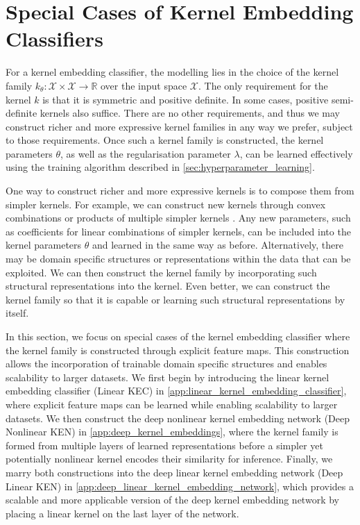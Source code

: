 \documentclass{article}
\begin{document}
		
			
\newpage
\section{Special Cases of Kernel Embedding Classifiers}
\label{app:special_cases}

	For a kernel embedding classifier, the modelling lies in the choice of the kernel family $k_{\theta} : \mathcal{X} \times \mathcal{X} \to \mathbb{R}$ over the input space $\mathcal{X}$. The only requirement for the kernel $k$ is that it is symmetric and positive definite. In some cases, positive semi-definite kernels also suffice. There are no other requirements, and thus we may construct richer and more expressive kernel families in any way we prefer, subject to those requirements. Once such a kernel family is constructed, the kernel parameters $\theta$, as well as the regularisation parameter $\lambda$, can be learned effectively using the training algorithm described in \cref{sec:hyperparameter_learning}.
	
	One way to construct richer and more expressive kernels is to compose them from simpler kernels. For example, we can construct new kernels through convex combinations or products of multiple simpler kernels \citep{genton2001classes}. Any new parameters, such as coefficients for linear combinations of simpler kernels, can be included into the kernel parameters $\theta$ and learned in the same way as before. Alternatively, there may be domain specific structures or representations within the data that can be exploited. We can then construct the kernel family by incorporating such structural representations into the kernel. Even better, we can construct the kernel family so that it is capable or learning such structural representations by itself.
	
	In this section, we focus on special cases of the kernel embedding classifier where the kernel family is constructed through explicit feature maps. This construction allows the incorporation of trainable domain specific structures and enables scalability to larger datasets. We first begin by introducing the linear kernel embedding classifier (Linear KEC) in \cref{app:linear_kernel_embedding_classifier}, where explicit feature maps can be learned while enabling scalability to larger datasets. We then construct the deep nonlinear kernel embedding network (Deep Nonlinear KEN) in \cref{app:deep_kernel_embeddings}, where the kernel family is formed from multiple layers of learned representations before a simpler yet potentially nonlinear kernel encodes their similarity for inference. Finally, we marry both constructions into the deep linear kernel embedding network (Deep Linear KEN) in \cref{app:deep_linear_kernel_embedding_network}, which provides a scalable and more applicable version of the deep kernel embedding network by placing a linear kernel on the last layer of the network.
\end{document}
